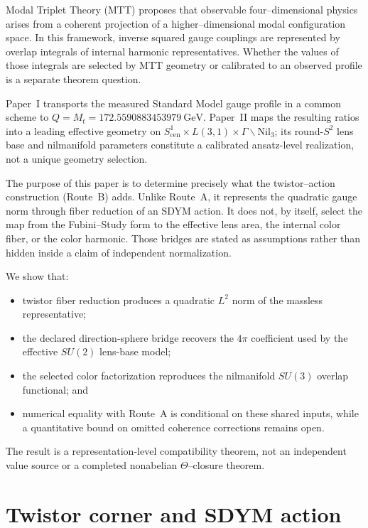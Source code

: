 \documentclass[11pt]{article}
\begin{document}
Modal Triplet Theory (MTT) proposes that observable four--dimensional physics
arises from a coherent projection of a higher--dimensional modal configuration
space. In this framework, inverse squared gauge couplings are represented by
overlap integrals of internal harmonic representatives. Whether the values of
those integrals are selected by MTT geometry or calibrated to an observed
profile is a separate theorem question.

Paper~I transports the measured Standard Model gauge profile in a common
scheme to $Q=M_t=172.5590883453979~\mathrm{GeV}$. Paper~II maps the resulting
ratios into a leading effective geometry on
$S^1_{\mathrm{cen}}\times L(3,1)\times\Gamma\backslash\mathrm{Nil}_3$; its
round-$S^2$ lens base and nilmanifold parameters constitute a calibrated
ansatz-level realization, not a unique geometry selection.

The purpose of this paper is to determine precisely what the twistor--action
construction (Route~B) adds. Unlike Route~A, it represents the quadratic gauge
norm through fiber reduction of an SDYM action. It does not, by itself, select
the map from the Fubini--Study form to the effective lens area, the internal
color fiber, or the color harmonic. Those bridges are stated as assumptions
rather than hidden inside a claim of independent normalization.

We show that:
\begin{itemize}
\item twistor fiber reduction produces a quadratic $L^2$ norm of the massless
representative;
\item the declared direction-sphere bridge recovers the $4\pi$ coefficient
used by the effective $SU(2)$ lens-base model;
\item the selected color factorization reproduces the nilmanifold $SU(3)$
overlap functional; and
\item numerical equality with Route~A is conditional on these shared inputs,
while a quantitative bound on omitted coherence corrections remains open.
\end{itemize}

The result is a representation-level compatibility theorem, not an
independent value source or a completed nonabelian $\Theta$--closure theorem.

\section{Twistor corner and SDYM action}
\end{document}
